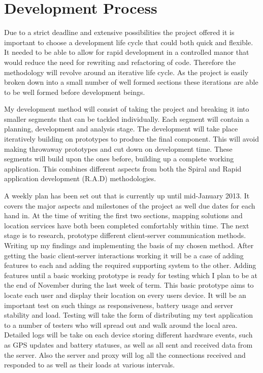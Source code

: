 \chapter{Development Process}
Due to a strict deadline and extensive possibilities the project offered it is important to choose a development life cycle that could both quick and flexible. It needed to be able to allow for rapid development in a controlled manor that would reduce the need for rewriting and refactoring of code. Therefore the methodology will revolve around an iterative life cycle. As the project is easily broken down into a small number of well formed sections these iterations are able to be well formed before development beings.

My development method will consist of taking the project and breaking it into smaller segments that can be tackled individually. Each segment will contain a planning, development and analysis stage. The development will take place iteratively building on prototypes to produce the final component. This will avoid making throwaway prototypes and cut down on development time. These segments will build upon the ones before, building up a complete working application. This combines different aspects from both the Spiral and Rapid application development (R.A.D) methodologies.

A weekly plan has been set out that is currently up until mid-January 2013. It covers the major aspects and milestones of the project as well due dates for each hand in. At the time of writing the first two sections, mapping solutions and location services have both been completed comfortably within time. The next stage is to research, prototype different client-server communication methods. Writing up my findings and implementing the basis of my chosen method. After getting the basic client-server interactions working it will be a case of adding features to each and adding the required supporting system to the other. Adding features until a basic working prototype is ready for testing which I plan to be at the end of November during the last week of term. This basic prototype aims to locate each user and display their location on every users device. It will be an important test on such things as responsiveness, battery usage and server stability and load. Testing will take the form of distributing my test application to a number of testers who will spread out and walk around the local area. Detailed logs will be take on each device storing different hardware events, such as GPS updates and battery statuses, as well as all sent and received data from the server. Also the server and proxy will log all the connections received and responded to as well as their loads at various intervals.

